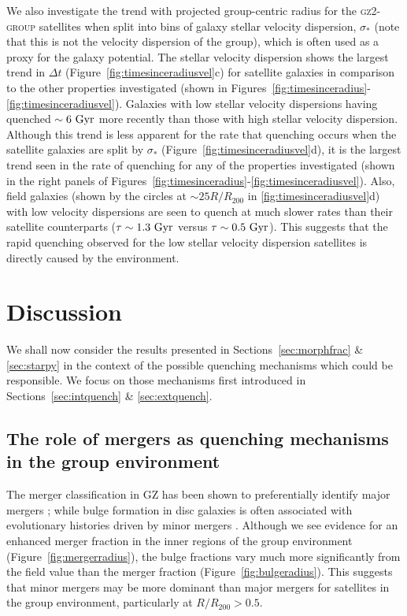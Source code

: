 \documentclass[useAMS,usenatbib]{mn2e}
\begin{document}
We also investigate the trend with projected group-centric radius for the \textsc{gz2-group} satellites when split into bins of galaxy stellar velocity dispersion, $\sigma_*$ (note that this is not the velocity dispersion of the group), which is often used as a proxy for the galaxy potential. The stellar velocity dispersion shows the largest trend in $\Delta t$ (Figure~\ref{fig:timesinceradiusvel}c) for satellite galaxies in comparison to the other properties investigated (shown in Figures~\ref{fig:timesinceradius}-\ref{fig:timesinceradiusvel}). Galaxies with low stellar velocity dispersions having quenched $\sim6~\rm{Gyr}$ more recently than those with high stellar velocity dispersion. Although this trend is less apparent for the rate that quenching occurs when the satellite galaxies are split by $\sigma_*$ (Figure~\ref{fig:timesinceradiusvel}d), it is the largest trend seen in the rate of quenching for any of the properties investigated (shown in the right panels of Figures~\ref{fig:timesinceradius}-\ref{fig:timesinceradiusvel}). Also, field galaxies (shown by the circles at $\sim 25 R/R_{200}$ in \ref{fig:timesinceradiusvel}d) with low velocity dispersions are seen to quench at much slower rates than their satellite counterparts ($\tau\sim1.3~\rm{Gyr}$ versus $\tau\sim0.5~\rm{Gyr}$). This suggests that the rapid quenching observed for the low stellar velocity dispersion satellites is directly caused by the environment. 


\section{Discussion}\label{sec:disc}

We shall now consider the results presented in Sections~\ref{sec:morphfrac} \& \ref{sec:starpy} in the context of the possible quenching mechanisms which could be responsible. We focus on those mechanisms first introduced in Sections~\ref{sec:intquench} \& \ref{sec:extquench}. 

\subsection{The role of mergers as quenching mechanisms in the group environment}\label{sec:rolemergerenv}

The merger classification in GZ has been shown to preferentially identify major mergers \citep{Darg10a, casteels13}; while bulge formation in disc galaxies is often associated with evolutionary histories driven by minor mergers \citep{Croton06, tonini16}.  Although we see evidence for an enhanced merger fraction in the inner regions of the group environment (Figure~\ref{fig:mergerradius}), the bulge fractions vary much more significantly from the field value than the merger fraction (Figure~\ref{fig:bulgeradius}). This suggests that minor mergers may be more dominant than major mergers for satellites in the group environment, particularly at $R/R_{200} > 0.5$. 
\end{document}
